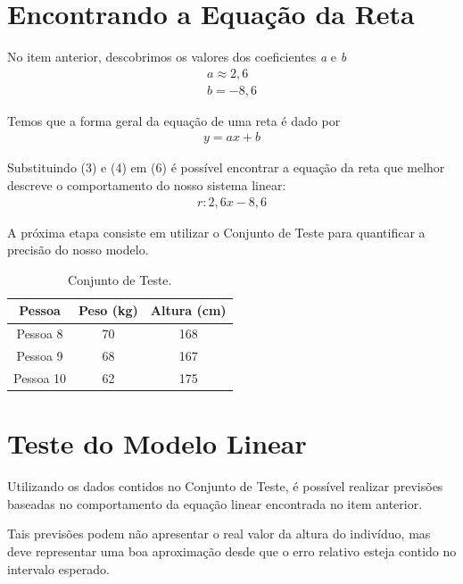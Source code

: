 \documentclass{article}
\begin{document}
\section{Encontrando a Equação da Reta}
    No item anterior, descobrimos os valores dos coeficientes \textit{a} e \textit{b}
    \begin{align*}
        \textit{a} \approx 2,6 \\
        \textit{b} = -8,6
    \end{align*}        
    
    Temos que a forma geral da equação de uma reta é dado por
    \begin{align}
        \textit{y} = \textit{ax} + \textit{b}
    \end{align}

    Substituindo (3) e (4) em (6) é possível encontrar a equação da reta que melhor descreve o comportamento do nosso sistema linear:
    \begin{align}
        \textit{r}: 2,6\textit{x} - 8,6
    \end{align}
    
    A próxima etapa consiste em utilizar o Conjunto de Teste para quantificar a precisão do nosso modelo.
    \begin{table}[ht]
    \centering
    \begin{tabular}{|c|c|c|}
    \hline
    \textbf{Pessoa} & \textbf{Peso (kg)} & \textbf{Altura (cm)} \\
    \hline
        Pessoa 8 & 70 & 168 \\
    \hline
        Pessoa 9 & 68 & 167 \\
    \hline
        Pessoa 10 & 62 & 175 \\
    \hline
    \end{tabular}
    \caption{Conjunto de Teste.}
    \label{tab:treino}
    \end{table}


\section{Teste do Modelo Linear}
    Utilizando os dados contidos no Conjunto de Teste, é possível realizar previsões baseadas no comportamento da equação linear encontrada no item anterior.
    
    Tais previsões podem não apresentar o real valor da altura do indivíduo, mas deve representar uma boa aproximação desde que o erro relativo esteja contido no intervalo esperado.
    
\end{document}
